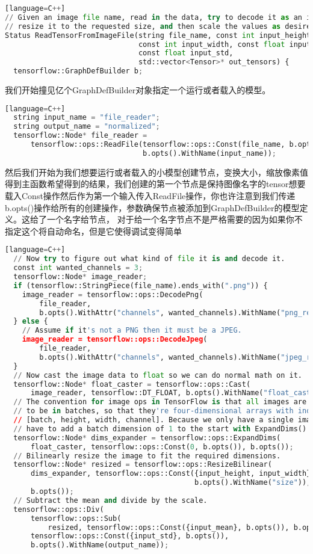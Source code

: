 \begin{lstlisting}[language=Python][language=C++]
// Given an image file name, read in the data, try to decode it as an image,
// resize it to the requested size, and then scale the values as desired.
Status ReadTensorFromImageFile(string file_name, const int input_height,
                               const int input_width, const float input_mean,
                               const float input_std,
                               std::vector<Tensor>* out_tensors) {
  tensorflow::GraphDefBuilder b;
\end{lstlisting}
我们开始撞见亿个GraphDefBuilder对象指定一个运行或者载入的模型。
\begin{lstlisting}[language=Python][language=C++]
  string input_name = "file_reader";
  string output_name = "normalized";
  tensorflow::Node* file_reader =
      tensorflow::ops::ReadFile(tensorflow::ops::Const(file_name, b.opts()),
                                b.opts().WithName(input_name));
\end{lstlisting}
然后我们开始为我们想要运行或者载入的小模型创建节点，变换大小，缩放像素值得到主函数希望得到的结果，我们创建的第一个节点是保持图像名字的tensor想要载入Const操作然后作为第一个输入传入ReadFile操作，你也许注意到我们传递b.opts()操作给所有的创建操作，参数确保节点被添加到GraphDefBuilder的模型定义。这给了一个名字给节点，
对于给一个名字节点不是严格需要的因为如果你不指定这个将自动命名，但是它使得调试变得简单
\begin{lstlisting}[language=Python][language=C++]
  // Now try to figure out what kind of file it is and decode it.
  const int wanted_channels = 3;
  tensorflow::Node* image_reader;
  if (tensorflow::StringPiece(file_name).ends_with(".png")) {
    image_reader = tensorflow::ops::DecodePng(
        file_reader,
        b.opts().WithAttr("channels", wanted_channels).WithName("png_reader"));
  } else {
    // Assume if it's not a PNG then it must be a JPEG.
    image_reader = tensorflow::ops::DecodeJpeg(
        file_reader,
        b.opts().WithAttr("channels", wanted_channels).WithName("jpeg_reader"));
  }
  // Now cast the image data to float so we can do normal math on it.
  tensorflow::Node* float_caster = tensorflow::ops::Cast(
      image_reader, tensorflow::DT_FLOAT, b.opts().WithName("float_caster"));
  // The convention for image ops in TensorFlow is that all images are expected
  // to be in batches, so that they're four-dimensional arrays with indices of
  // [batch, height, width, channel]. Because we only have a single image, we
  // have to add a batch dimension of 1 to the start with ExpandDims().
  tensorflow::Node* dims_expander = tensorflow::ops::ExpandDims(
      float_caster, tensorflow::ops::Const(0, b.opts()), b.opts());
  // Bilinearly resize the image to fit the required dimensions.
  tensorflow::Node* resized = tensorflow::ops::ResizeBilinear(
      dims_expander, tensorflow::ops::Const({input_height, input_width},
                                            b.opts().WithName("size")),
      b.opts());
  // Subtract the mean and divide by the scale.
  tensorflow::ops::Div(
      tensorflow::ops::Sub(
          resized, tensorflow::ops::Const({input_mean}, b.opts()), b.opts()),
      tensorflow::ops::Const({input_std}, b.opts()),
      b.opts().WithName(output_name));
\end{lstlisting}
